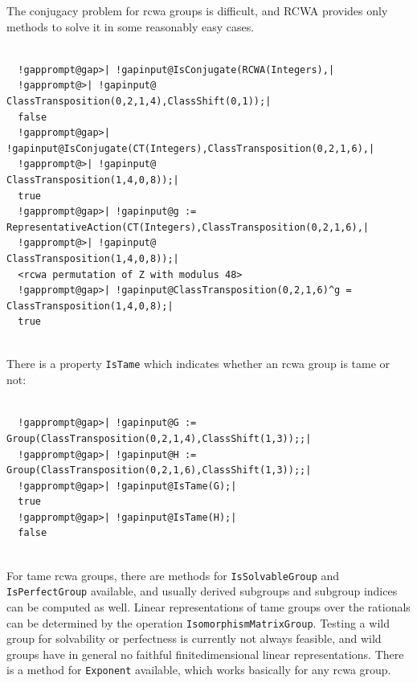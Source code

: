 \documentclass[a4paper,11pt]{report}
\begin{document}
{{\begin{Verbatim}[commandchars=!@|,fontsize=\small,frame=single,label=Example]
\end{Verbatim}
    The conjugacy problem for rcwa groups is difficult, and \textsf{RCWA} provides only methods to solve it in some reasonably easy cases. 
\begin{Verbatim}[commandchars=!@|,fontsize=\small,frame=single,label=Example]
  
  !gapprompt@gap>| !gapinput@IsConjugate(RCWA(Integers),|
  !gapprompt@>| !gapinput@               ClassTransposition(0,2,1,4),ClassShift(0,1));|
  false
  !gapprompt@gap>| !gapinput@IsConjugate(CT(Integers),ClassTransposition(0,2,1,6),|
  !gapprompt@>| !gapinput@                            ClassTransposition(1,4,0,8));|
  true
  !gapprompt@gap>| !gapinput@g := RepresentativeAction(CT(Integers),ClassTransposition(0,2,1,6),|
  !gapprompt@>| !gapinput@                                          ClassTransposition(1,4,0,8));|
  <rcwa permutation of Z with modulus 48>
  !gapprompt@gap>| !gapinput@ClassTransposition(0,2,1,6)^g = ClassTransposition(1,4,0,8);|
  true
  
\end{Verbatim}
  There is a property \texttt{IsTame} which indicates whether an rcwa group is tame or not: 
\begin{Verbatim}[commandchars=!@|,fontsize=\small,frame=single,label=Example]
  
  !gapprompt@gap>| !gapinput@G := Group(ClassTransposition(0,2,1,4),ClassShift(1,3));;|
  !gapprompt@gap>| !gapinput@H := Group(ClassTransposition(0,2,1,6),ClassShift(1,3));;|
  !gapprompt@gap>| !gapinput@IsTame(G);|
  true
  !gapprompt@gap>| !gapinput@IsTame(H);|
  false
  
\end{Verbatim}
       For tame rcwa groups, there are methods for \texttt{IsSolvableGroup} and \texttt{IsPerfectGroup} available, and usually derived subgroups and subgroup indices can be computed
as well. Linear representations of tame groups over the rationals can be
determined by the operation \texttt{IsomorphismMatrixGroup}. Testing a wild group for solvability or perfectness is currently not always
feasible, and wild groups have in general no faithful
finite\texttt{}dimensional linear representations. There is a
method for \texttt{Exponent} available, which works basically for any rcwa group. 
\begin{Verbatim}[commandchars=!@|,fontsize=\small,frame=single,label=Example]
  

\end{Verbatim}}}
\end{document}
